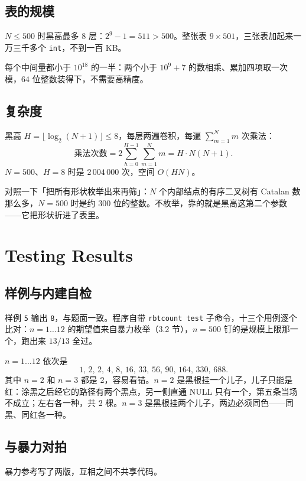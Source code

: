 \documentclass[12pt,a4paper,fontset=windows]{ctexart}
\newcommand{\code}[1]{\texttt{#1}}
\begin{document}
\subsection{表的规模}

$N\le 500$ 时黑高最多 8 层：$2^9-1=511>500$。整张表 $9\times 501$，三张表加起来一万三千多个 \code{int}，不到一百 KB。

每个中间量都小于 $10^{18}$ 的一半：两个小于 $10^9+7$ 的数相乘、累加四项取一次模，$64$ 位整数装得下，不需要高精度。

\subsection{复杂度}

黑高 $H=\lfloor\log_2(N+1)\rfloor\le 8$，每层两遍卷积，每遍 $\sum_{m=1}^{N}m$ 次乘法：
\[
\text{乘法次数}=2\sum_{h=0}^{H-1}\sum_{m=1}^{N}m=H\cdot N(N+1).
\]
$N=500$、$H=8$ 时是 $2\,004\,000$ 次，空间 $O(HN)$。

对照一下「把所有形状枚举出来再筛」：$N$ 个内部结点的有序二叉树有 Catalan 数那么多，$N=500$ 时是约 300 位的整数。不枚举，靠的就是黑高这第二个参数——它把形状折进了表里。

\section{Testing Results}

\subsection{样例与内建自检}

样例 \code{5} 输出 \code{8}，与题面一致。程序自带 \code{rbtcount test} 子命令，十三个用例逐个比对：$n=1\ldots 12$ 的期望值来自暴力枚举（3.2 节），$n=500$ 钉的是规模上限那一个，跑出来 $13/13$ 全过。

$n=1\ldots 12$ 依次是
\[
1,\,2,\,2,\,4,\,8,\,16,\,33,\,56,\,90,\,164,\,330,\,688 .
\]
其中 $n=2$ 和 $n=3$ 都是 2，容易看错。$n=2$ 是黑根挂一个儿子，儿子只能是红：涂黑之后经它的路径有两个黑点，另一侧直通 NULL 只有一个，第五条当场不成立；左右各一种，共 2 棵。$n=3$ 是黑根挂两个儿子，两边必须同色——同黑、同红各一种。

\subsection{与暴力对拍}

暴力参考写了两版，互相之间不共享代码。
\end{document}
